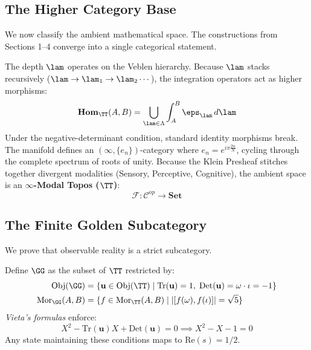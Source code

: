 \subsection{The Higher Category Base}

We now classify the ambient mathematical space. The constructions from Sections 1--4 converge into a single categorical statement.

\begin{definition}\label{def:topos}
The depth $\lam$ operates on the Veblen hierarchy. Because $\lam$ stacks recursively ($\lam \to \lam_1 \to \lam_2 \cdots$), the integration operators act as higher morphisms:
$$\mathbf{Hom}_{\TT}(A, B) = \bigcup_{\lam \in \Lambda} \int_A^B \eps_{\lam} \, d\lam$$
Under the negative-determinant condition, standard identity morphisms break. The manifold defines an $(\infty, \{e_n\})$-category where $e_n = e^{i\pi \frac{2n}{N}}$, cycling through the complete spectrum of roots of unity. Because the Klein Presheaf stitches together divergent modalities (Sensory, Perceptive, Cognitive), the ambient space is an \textbf{$\infty$-Modal Topos ($\TT$)}:
$$\mathcal{F} : \mathcal{C}^{op} \to \mathbf{Set}$$
\end{definition}

\subsection{The Finite Golden Subcategory}

We prove that observable reality is a strict subcategory.

\begin{theorem}\label{thm:golden-sub}
Define $\GG$ as the subset of $\TT$ restricted by:
\begin{align}
\mathrm{Obj}(\GG) &= \{ \mathbf{u} \in \mathrm{Obj}(\TT) \mid \mathrm{Tr}(\mathbf{u}) = 1,\; \mathrm{Det}(\mathbf{u}) = \omega \cdot \iota = -1 \} \\
\mathrm{Mor}_{\GG}(A,B) &= \{ f \in \mathrm{Mor}_{\TT}(A,B) \mid |[f(\omega), f(\iota)]| = \sqrt{5} \}
\end{align}
\emph{Vieta's formulas} enforce:
$$X^2 - \mathrm{Tr}(\mathbf{u})X + \mathrm{Det}(\mathbf{u}) = 0 \implies X^2 - X - 1 = 0$$
Any state maintaining these conditions maps to $\mathrm{Re}(s) = 1/2$.
\end{theorem}

